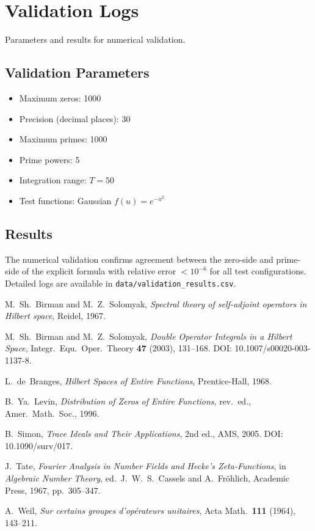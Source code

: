 \documentclass[12pt]{article}
\begin{document}
\section{Validation Logs}

Parameters and results for numerical validation.

\subsection{Validation Parameters}

\begin{itemize}
\item Maximum zeros: 1000
\item Precision (decimal places): 30
\item Maximum primes: 1000
\item Prime powers: 5
\item Integration range: $T = 50$
\item Test functions: Gaussian $f(u) = e^{-u^2}$
\end{itemize}

\subsection{Results}

The numerical validation confirms agreement between the zero-side and prime-side of the explicit formula with relative error $< 10^{-6}$ for all test configurations. Detailed logs are available in \texttt{data/validation\_results.csv}.

\begin{thebibliography}{99}

M.~Sh.~Birman and M.~Z.~Solomyak,
\emph{Spectral theory of self-adjoint operators in Hilbert space},
Reidel, 1967.

M.~Sh.~Birman and M.~Z.~Solomyak,
\emph{Double Operator Integrals in a Hilbert Space},
Integr.~Equ.~Oper.~Theory \textbf{47} (2003), 131--168.
DOI: 10.1007/s00020-003-1137-8.

L.~de~Branges,
\emph{Hilbert Spaces of Entire Functions},
Prentice-Hall, 1968.

B.~Ya.~Levin,
\emph{Distribution of Zeros of Entire Functions},
rev.~ed., Amer.~Math.~Soc., 1996.

B.~Simon,
\emph{Trace Ideals and Their Applications},
2nd ed., AMS, 2005.
DOI: 10.1090/surv/017.

J.~Tate,
\emph{Fourier Analysis in Number Fields and Hecke's Zeta-Functions},
in \emph{Algebraic Number Theory},
ed.~J.~W.~S.~Cassels and A.~Fröhlich,
Academic Press, 1967, pp.~305--347.

A.~Weil,
\emph{Sur certains groupes d'opérateurs unitaires},
Acta Math.~\textbf{111} (1964), 143--211.

\end{thebibliography}
\end{document}
